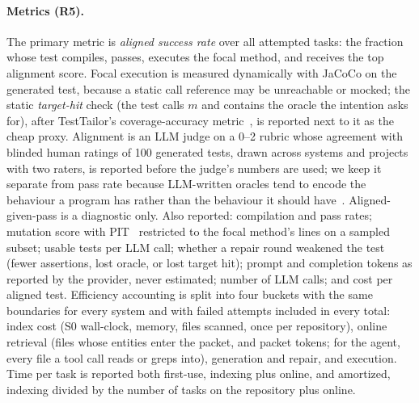 \documentclass[sigconf,nonacm]{acmart}
\begin{document}
\paragraph{Metrics (R5).}
The primary metric is \emph{aligned success rate} over all attempted tasks: the fraction whose test compiles, passes, executes the focal method, and receives the top alignment score. Focal execution is measured dynamically with JaCoCo on the generated test, because a static call reference may be unreachable or mocked; the static \emph{target-hit} check (the test calls $m$ and contains the oracle the intention asks for), after TestTailor's coverage-accuracy metric~\cite{zhou2026testtailor}, is reported next to it as the cheap proxy. Alignment is an LLM judge on a 0--2 rubric whose agreement with blinded human ratings of 100 generated tests, drawn across systems and projects with two raters, is reported before the judge's numbers are used; we keep it separate from pass rate because LLM-written oracles tend to encode the behaviour a program has rather than the behaviour it should have~\cite{konstantinou2024oracles}. Aligned-given-pass is a diagnostic only. Also reported: compilation and pass rates; mutation score with PIT~\cite{coles2016pit} restricted to the focal method's lines on a sampled subset; usable tests per LLM call; whether a repair round weakened the test (fewer assertions, lost oracle, or lost target hit); prompt and completion tokens as reported by the provider, never estimated; number of LLM calls; and cost per aligned test. Efficiency accounting is split into four buckets with the same boundaries for every system and with failed attempts included in every total: index cost (S0 wall-clock, memory, files scanned, once per repository), online retrieval (files whose entities enter the packet, and packet tokens; for the agent, every file a tool call reads or greps into), generation and repair, and execution. Time per task is reported both first-use, indexing plus online, and amortized, indexing divided by the number of tasks on the repository plus online.
\end{document}
